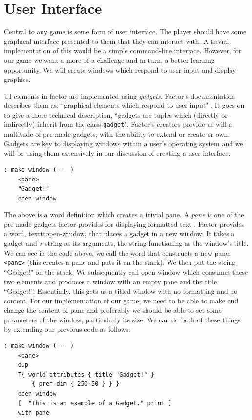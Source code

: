 \documentclass{sig-alternate}
\begin{document}
\section{User Interface}
Central to any game is some form of user interface. The player should have some graphical interface presented to them that they can interact with. A trivial implementation of this would be a simple command-line interface. However, for our game we want a more of a challenge and in turn, a better learning opportunity. We will create windows which respond to user input and display graphics.

UI elements in factor are implemented using \textit{gadgets}.  Factor's documentation describes them as: ``graphical elements which respond to user input"  \cite{BuildingUI}. It goes on to give a more technical description, ``gadgets are tuples which (directly or indirectly) inherit from the class \texttt{gadget}"\cite{BuildingUI}. Factor's creators provide us will a multitude of pre-made gadgets, with the ability to extend or create or own. Gadgets are key to displaying windows within a user's operating system and we will be using them extensively in our discussion of creating a user interface.
\begin{verbatim}
: make-window ( -- )
    <pane>
    "Gadget!"
    open-window
\end{verbatim}

The above is a word definition which creates a trivial pane. A \textit{pane} is one of the pre-made gadgets factor provides for displaying formatted text \cite{Pane}.  Factor provides a word, texttt{open-window}, that places a gadget in a new window. It takes a gadget and a string as its arguments, the string functioning as the window's title. We can see in the code above, we call the word that constructs a new pane: \texttt{<pane>} (this creates a pane and puts it on the stack). We then put the string ``Gadget!" on the stack. We subsequently call open-window which consumes these two elements and produces a window with an empty pane and the title ``Gadget!''. Essentially, this gets us a titled window with no formatting and no content. For our implementation of our game, we need to be able to make and change the content of pane and preferably we should be able to set some parameters of the window, particularly its size.  We can do both of these things by extending our previous code as follows:
\begin{verbatim}
: make-window ( -- )
    <pane>
    dup
    T{ world-attributes { title "Gadget!" }
        { pref-dim { 250 50 } } }
    open-window
    [  "This is an example of a Gadget." print ]
    with-pane
    \end{verbatim}
\end{document}
